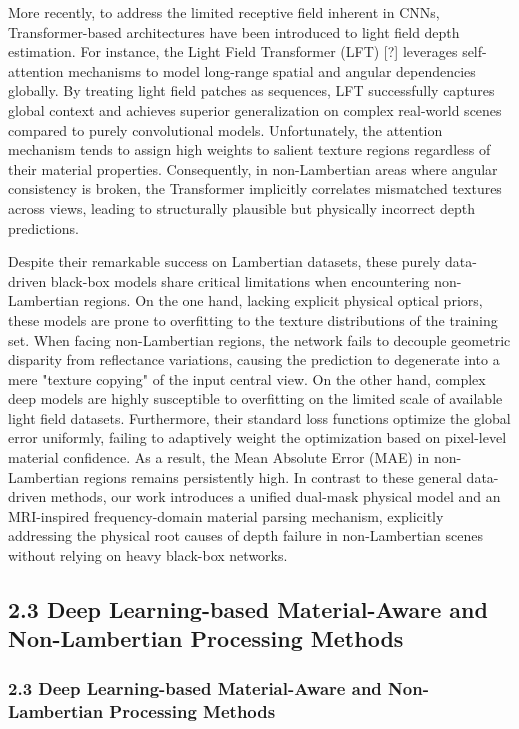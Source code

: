 \documentclass[journal]{IEEEtran}
\begin{document}
More recently, to address the limited receptive field inherent in CNNs, Transformer-based architectures have been introduced to light field depth estimation. For instance, the Light Field Transformer (LFT) [?] leverages self-attention mechanisms to model long-range spatial and angular dependencies globally. By treating light field patches as sequences, LFT successfully captures global context and achieves superior generalization on complex real-world scenes compared to purely convolutional models. Unfortunately, the attention mechanism tends to assign high weights to salient texture regions regardless of their material properties. Consequently, in non-Lambertian areas where angular consistency is broken, the Transformer implicitly correlates mismatched textures across views, leading to structurally plausible but physically incorrect depth predictions.

Despite their remarkable success on Lambertian datasets, these purely data-driven black-box models share critical limitations when encountering non-Lambertian regions. On the one hand, lacking explicit physical optical priors, these models are prone to overfitting to the texture distributions of the training set. When facing non-Lambertian regions, the network fails to decouple geometric disparity from reflectance variations, causing the prediction to degenerate into a mere "texture copying" of the input central view. On the other hand, complex deep models are highly susceptible to overfitting on the limited scale of available light field datasets. Furthermore, their standard loss functions optimize the global error uniformly, failing to adaptively weight the optimization based on pixel-level material confidence. As a result, the Mean Absolute Error (MAE) in non-Lambertian regions remains persistently high. In contrast to these general data-driven methods, our work introduces a unified dual-mask physical model and an MRI-inspired frequency-domain material parsing mechanism, explicitly addressing the physical root causes of depth failure in non-Lambertian scenes without relying on heavy black-box networks.

\subsection{2.3 Deep Learning-based Material-Aware and Non-Lambertian Processing Methods}

\subsubsection{2.3 Deep Learning-based Material-Aware and Non-Lambertian Processing Methods}
\end{document}
